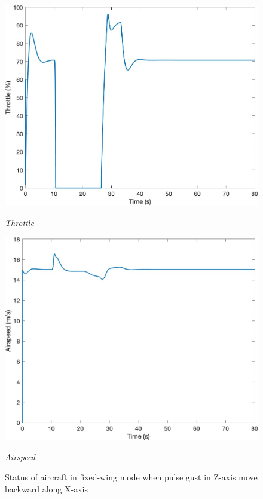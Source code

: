 \begin{figure}[htbp]
\begin{minipage}[b]{0.45\textwidth}
    \centering
    \includegraphics[width=\textwidth]{Images/Gust/Gust FWD pulse 0428/5 Throttle_4.jpg}
    \caption*{\textit{Throttle}}
  \end{minipage}
  \hfil
  \begin{minipage}[b]{0.45\textwidth}
    \centering
    \includegraphics[width=\textwidth]{Images/Gust/Gust FWD pulse 0428/6 Airspeed_4.jpg}
    \caption*{\textit{Airspeed}}
  \end{minipage}
  \caption{Status of aircraft in fixed-wing mode when pulse gust in Z-axis move backward along X-axis}
  \label{fig:Gust FWD pulse z}
\end{figure}

